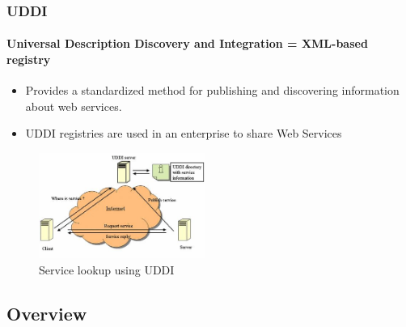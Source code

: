 \documentclass{beamer}
\begin{document}
\begin{frame}
\frametitle{UDDI}
\framesubtitle{Universal Description Discovery and Integration = XML-based registry}
\begin{itemize}
  \item Provides a standardized method for publishing and discovering information about web services.  
  \item UDDI registries are used in an enterprise to share Web Services
\end{itemize}

\begin{figure}
\centering
\includegraphics[height=130]{../pics/uddi.jpg}
\caption{Service lookup using UDDI}
\label{overflow}
\end{figure}

\end{frame}

\subsection[Short First Subsection Name]{Overview}
\end{document}
